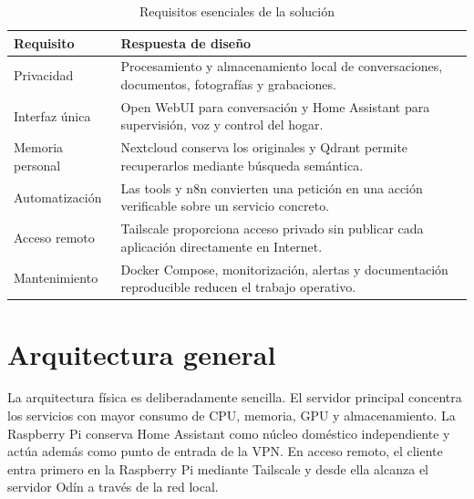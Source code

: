\begin{table}[H]
  \centering
  \caption{Requisitos esenciales de la solución}
  \label{tab:requisitos-diseno}
  \begin{tabularx}{\textwidth}{lX}
    \toprule
    Requisito & Respuesta de diseño \\
    \midrule
    Privacidad & Procesamiento y almacenamiento local de conversaciones,
    documentos, fotografías y grabaciones. \\
    Interfaz única & Open WebUI para conversación y Home Assistant para
    supervisión, voz y control del hogar. \\
    Memoria personal & Nextcloud conserva los originales y Qdrant permite
    recuperarlos mediante búsqueda semántica. \\
    Automatización & Las tools y n8n convierten una petición en una acción
    verificable sobre un servicio concreto. \\
    Acceso remoto & Tailscale proporciona acceso privado sin publicar cada
    aplicación directamente en Internet. \\
    Mantenimiento & Docker Compose, monitorización, alertas y documentación
    reproducible reducen el trabajo operativo. \\
    \bottomrule
  \end{tabularx}
\end{table}

\section{Arquitectura general}
La arquitectura física es deliberadamente sencilla. El servidor principal
concentra los servicios con mayor consumo de CPU, memoria, GPU y
almacenamiento. La Raspberry Pi conserva Home Assistant como núcleo doméstico
independiente y actúa además como punto de entrada de la VPN. En acceso remoto,
el cliente entra primero en la Raspberry Pi mediante Tailscale y desde ella
alcanza el servidor Odín a través de la red local.

